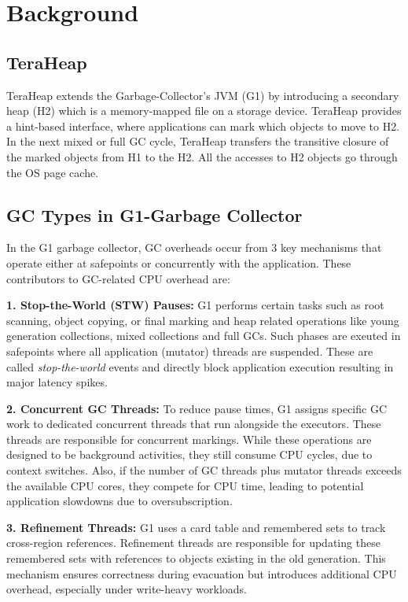 \section{Background}



\subsection{TeraHeap}
TeraHeap extends the Garbage-Collector's JVM (G1) by introducing a
secondary heap (H2) which is a memory-mapped file on a storage device. TeraHeap
provides a hint-based interface, where applications can mark which objects to
move to H2. In the next mixed or full GC cycle, TeraHeap transfers the
transitive closure of the marked objects from H1 to the H2. All the accesses to
H2 objects go through the OS page cache.

\subsection{GC Types in G1-Garbage Collector} In the G1 garbage collector, GC
overheads occur from 3 key mechanisms that operate either at safepoints or
concurrently with the application. These contributors to GC-related CPU
overhead are:

\textbf{1. Stop-the-World (STW) Pauses:}  G1 performs certain tasks such as
root scanning, object copying, or final marking and heap related operations
like young generation collections, mixed collections and full GCs. Such phases
are exeuted in safepoints where all application (mutator) threads are
suspended. These are called \emph{stop-the-world} events and directly block
application execution resulting in major latency spikes.

\textbf{2. Concurrent GC Threads:}  To reduce pause times, G1 assigns specific
GC work to dedicated concurrent threads that run alongside the executors. These
threads are responsible for concurrent markings. While these operations are
designed to be background activities, they still consume CPU cycles, due to
context switches. Also, if the number of GC threads plus mutator threads
exceeds the available CPU cores, they compete for CPU time, leading to
potential application slowdowns due to oversubscription.

\textbf{3. Refinement Threads:}  G1 uses a card table and remembered sets to
track cross-region references. Refinement threads are responsible for updating
these remembered sets with references to objects existing in the old
generation. This mechanism ensures correctness during evacuation but introduces
additional CPU overhead, especially under write-heavy workloads.


